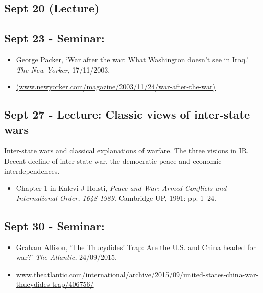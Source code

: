 \documentclass[12pt, a4paper]{article}
\begin{document}
\subsection*{Sept 20 (Lecture) {\color{red}{No class}}}

\subsection*{Sept 23 - Seminar:}

\begin{itemize}
\setlength\itemsep{-5pt}
\item George Packer, `War after the war: What Washington doesn't see in Iraq.' \textit{The New Yorker}, 17/11/2003.
\item[] \href{https://www.newyorker.com/magazine/2003/11/24/war-after-the-war}{(www.newyorker.com/magazine/2003/11/24/war-after-the-war)}
\end{itemize}

\subsection*{Sept 27 - Lecture: Classic views of inter-state wars}

Inter-state wars and classical explanations of warfare. The three visions in IR. Decent decline of inter-state war, the democratic peace and economic interdependences.

\begin{itemize}
\setlength\itemsep{0pt}
\item Chapter 1 in Kalevi J Holsti, \textit{Peace and War: Armed Conflicts and International Order, 1648-1989.} Cambridge UP, 1991: pp. 1--24.
\end{itemize}

\subsection*{Sept 30 - Seminar:}

\begin{itemize}
\setlength\itemsep{0pt}
\item Graham Allison, `The Thucydides' Trap: Are the U.S. and China headed for war?' \textit{The Atlantic,} 24/09/2015.
\item[] \href{https://www.theatlantic.com/international/archive/2015/09/united-states-china-war-thucydides-trap/406756/}{www.theatlantic.com/international/archive/2015/09/united-states-china-war-thucydides-trap/406756/}
\end{itemize}
\end{document}
